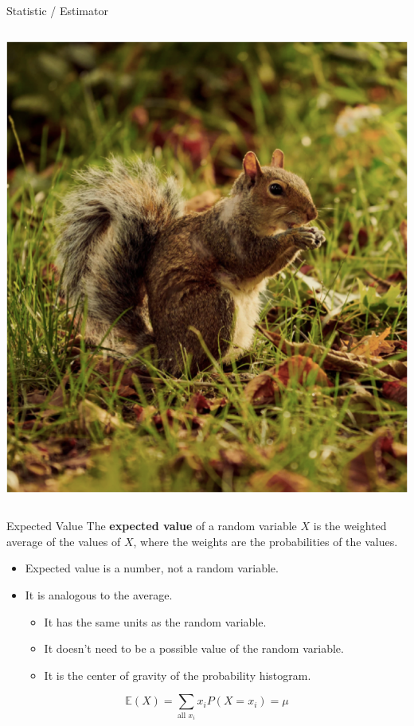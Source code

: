 \documentclass[aspectratio=169]{../latex_main/tntbeamer}  %
\begin{document}
\begin{frame}{Statistic / Estimator}
\begin{columns}
\begin{column}{.4\textwidth}
	            \includegraphics[scale=.45]{Bild2}
	            
	        \end{column}
	        
	        \end{columns}
	\end{frame}

\begin{frame}{Expected Value}
    The \textbf{expected value} of a random variable $X$ is the weighted average of the values of $X$, where the weights are the probabilities of the values.

    \begin{itemize}
        \item Expected value is a number, not a random variable.
        \item It is analogous to the average.
            \begin{itemize}
                \item It has the same units as the random variable.
                \item It doesn’t need to be a possible value of the random variable.
                \item It is the center of gravity of the probability histogram.
            \end{itemize}
    \end{itemize}

$$\mathbb{E}(X) = \sum_{\text{all } x_i } x_i P(X=x_i) = \mu$$
    
\end{frame}
\end{document}
